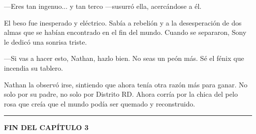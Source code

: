 \documentclass[12pt,a4paper]{book}
\begin{document}
---Eres tan ingenuo... y tan terco ---susurró ella, acercándose a él.

El beso fue inesperado y eléctrico. Sabía a rebelión y a la desesperación de dos almas que se habían encontrado en el fin del mundo. Cuando se separaron, Sony le dedicó una sonrisa triste.

---Si vas a hacer esto, Nathan, hazlo bien. No seas un peón más. Sé el fénix que incendia su tablero.

Nathan la observó irse, sintiendo que ahora tenía otra razón más para ganar. No solo por su padre, no solo por Distrito RD. Ahora corría por la chica del pelo rosa que creía que el mundo podía ser quemado y reconstruido.

\bigskip
\noindent\rule{\textwidth}{0.4pt}
\bigskip

\textbf{FIN DEL CAPÍTULO 3}
\end{document}
